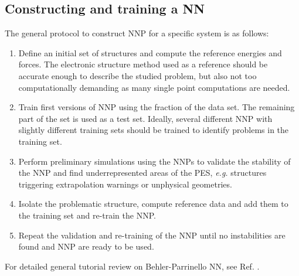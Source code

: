 \documentclass[12pt]{article}
\begin{document}
%
%
\subsection{Constructing and training a NN}
The general protocol to construct NNP for a specific system is as follows:
\begin{enumerate}
    \item Define an initial set of structures and compute the reference energies and forces. The electronic structure method used as a reference should be accurate enough to describe the studied problem, but also not too computationally demanding as many single point computations are needed.
    \item Train first versions of NNP using the fraction of the data set. The remaining part of the set is used as a test set. Ideally, several different NNP with slightly different training sets should be trained to identify problems in the training set.
    \item Perform preliminary simulations using the NNPs to validate the stability of the NNP and find underrepresented areas of the PES, \textit{e.g.} structures triggering extrapolation warnings or unphysical geometries.
    \item Isolate the problematic structure, compute reference data and add them to the training set and re-train the NNP.
    \item Repeat the validation and re-training of the NNP until no instabilities are found and NNP are ready to be used.
\end{enumerate}

For detailed general tutorial review on Behler-Parrinello NN, see Ref. . 
\end{document}
